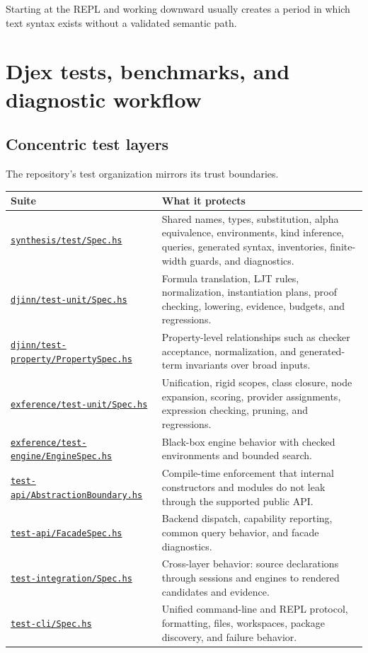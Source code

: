 \documentclass[10pt,letterpaper,oneside]{report}
\def\DjexBase{https://github.com/VladimirReshetnikov/Djex/blob/e454757d53ec057238c22fc6cd0d935b7d96b3dc/}
\newcommand{\dpath}[1]{\href{\DjexBase#1}{\nolinkurl{#1}}}
\begin{document}
Starting at the REPL and working downward usually creates a period in which text syntax exists without a validated semantic path.

\chapter{Djex tests, benchmarks, and diagnostic workflow}\label{ch:djex-tests}

\section{Concentric test layers}

The repository's test organization mirrors its trust boundaries.

\begin{longtable}{@{}L{0.28\textwidth}L{0.64\textwidth}@{}}
\toprule
\textbf{Suite} & \textbf{What it protects} \\
\midrule
\endhead
\dpath{synthesis/test/Spec.hs} & Shared names, types, substitution, alpha equivalence, environments, kind inference, queries, generated syntax, inventories, finite-width guards, and diagnostics. \\
\dpath{djinn/test-unit/Spec.hs} & Formula translation, LJT rules, normalization, instantiation plans, proof checking, lowering, evidence, budgets, and regressions. \\
\dpath{djinn/test-property/PropertySpec.hs} & Property-level relationships such as checker acceptance, normalization, and generated-term invariants over broad inputs. \\
\dpath{exference/test-unit/Spec.hs} & Unification, rigid scopes, class closure, node expansion, scoring, provider assignments, expression checking, pruning, and regressions. \\
\dpath{exference/test-engine/EngineSpec.hs} & Black-box engine behavior with checked environments and bounded search. \\
\dpath{test-api/AbstractionBoundary.hs} & Compile-time enforcement that internal constructors and modules do not leak through the supported public API. \\
\dpath{test-api/FacadeSpec.hs} & Backend dispatch, capability reporting, common query behavior, and facade diagnostics. \\
\dpath{test-integration/Spec.hs} & Cross-layer behavior: source declarations through sessions and engines to rendered candidates and evidence. \\
\dpath{test-cli/Spec.hs} & Unified command-line and REPL protocol, formatting, files, workspaces, package discovery, and failure behavior. \\

\end{longtable}
\end{document}
